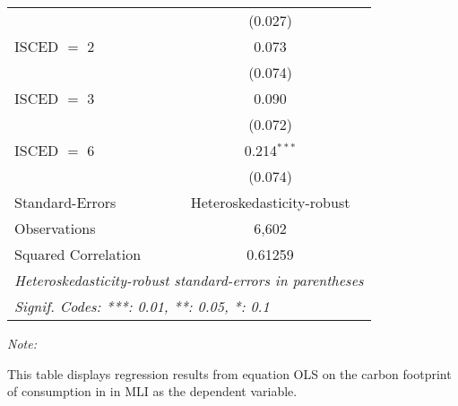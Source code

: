 \begin{table}[htbp!]
\begin{adjustbox}{width = 1\textwidth, max height = 0.95\textheight, center}
\begin{threeparttable}[b]
\begin{tabular}{lc}
                                & (0.027)\\   
            ISCED $=$ 2         & 0.073\\   
                                & (0.074)\\   
            ISCED $=$ 3         & 0.090\\   
                                & (0.072)\\   
            ISCED $=$ 6         & 0.214$^{***}$\\   
                                & (0.074)\\   
            \midrule 
            Standard-Errors     & Heteroskedasticity-robust \\   
            Observations        & 6,602\\  
            Squared Correlation & 0.61259\\  
            \midrule \midrule
            \multicolumn{2}{l}{\emph{Heteroskedasticity-robust standard-errors in parentheses}}\\
            \multicolumn{2}{l}{\emph{Signif. Codes: ***: 0.01, **: 0.05, *: 0.1}}\\
         \end{tabular}
         
         \begin{tablenotes}\item \medskip \textit{Note:}
            \item This table displays regression results from equation OLS on the carbon footprint of consumption in  in MLI as the dependent variable.  
         \end{tablenotes}
      \end{threeparttable}
   \end{adjustbox}
\end{table}


